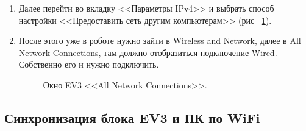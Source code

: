 \documentclass[12pt,a4paper,openany]{extarticle}
\begin{document}
\begin{enumerate}
\item Далее перейти во вкладку <<Параметры IPv4>> и выбрать способ настройки <<Предоставить сеть другим компьютерам>> (рис ~\ref{editing_ev3_2}).
  
\begin{figure}[h!]
	\noindent{}
	\caption{}
	\label{editing_ev3_2}
\end{figure}  

\item После этого уже в роботе нужно зайти в Wireless and Network, далее в All Network Connections, там должно отобразиться подключение Wired. Собственно его и нужно подключить.

\begin{figure}[h!]
	\noindent{}
	\caption{Окно EV3 <<All Network Connections>>.}
	\label{networking_EV3}
\end{figure}
    
\end{enumerate}

\subsection{Синхронизация блока EV3 и ПК по WiFi}
\end{document}
